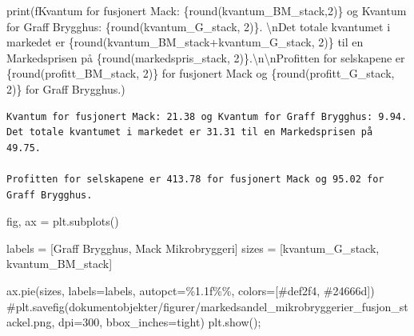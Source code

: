 \documentclass[
  12pt,
  a4paper,
  DIV=11,
  numbers=noendperiod]{scrartcl}
\newenvironment{Shaded}{\begin{snugshade}}{\end{snugshade}}
\newcommand{\BuiltInTok}[1]{\textcolor[rgb]{0.00,0.23,0.31}{#1}}
\newcommand{\CharTok}[1]{\textcolor[rgb]{0.13,0.47,0.30}{#1}}
\newcommand{\CommentTok}[1]{\textcolor[rgb]{0.37,0.37,0.37}{#1}}
\newcommand{\DecValTok}[1]{\textcolor[rgb]{0.68,0.00,0.00}{#1}}
\newcommand{\NormalTok}[1]{\textcolor[rgb]{0.00,0.23,0.31}{#1}}
\newcommand{\OperatorTok}[1]{\textcolor[rgb]{0.37,0.37,0.37}{#1}}
\newcommand{\SpecialCharTok}[1]{\textcolor[rgb]{0.37,0.37,0.37}{#1}}
\newcommand{\SpecialStringTok}[1]{\textcolor[rgb]{0.13,0.47,0.30}{#1}}
\newcommand{\StringTok}[1]{\textcolor[rgb]{0.13,0.47,0.30}{#1}}
\begin{document}
\begin{Shaded}
\begin{Highlighting}[]
\BuiltInTok{print}\NormalTok{(}\SpecialStringTok{f\textquotesingle{}\textquotesingle{}\textquotesingle{}Kvantum for fusjonert Mack: }\SpecialCharTok{\{}\BuiltInTok{round}\NormalTok{(kvantum\_BM\_stack,}\DecValTok{2}\NormalTok{)}\SpecialCharTok{\}}\SpecialStringTok{ og Kvantum for Graff Brygghus: }\SpecialCharTok{\{}\BuiltInTok{round}\NormalTok{(kvantum\_G\_stack, }\DecValTok{2}\NormalTok{)}\SpecialCharTok{\}}\SpecialStringTok{. }\CharTok{\textbackslash{}n}\SpecialStringTok{Det totale kvantumet i markedet er }\SpecialCharTok{\{}\BuiltInTok{round}\NormalTok{(kvantum\_BM\_stack}\OperatorTok{+}\NormalTok{kvantum\_G\_stack, }\DecValTok{2}\NormalTok{)}\SpecialCharTok{\}}\SpecialStringTok{ til en Markedsprisen på }\SpecialCharTok{\{}\BuiltInTok{round}\NormalTok{(markedspris\_stack, }\DecValTok{2}\NormalTok{)}\SpecialCharTok{\}}\SpecialStringTok{.}\CharTok{\textbackslash{}n\textbackslash{}n}\SpecialStringTok{Profitten for selskapene er }\SpecialCharTok{\{}\BuiltInTok{round}\NormalTok{(profitt\_BM\_stack, }\DecValTok{2}\NormalTok{)}\SpecialCharTok{\}}\SpecialStringTok{ for fusjonert Mack og }\SpecialCharTok{\{}\BuiltInTok{round}\NormalTok{(profitt\_G\_stack, }\DecValTok{2}\NormalTok{)}\SpecialCharTok{\}}\SpecialStringTok{ for Graff Brygghus.\textquotesingle{}\textquotesingle{}\textquotesingle{}}\NormalTok{)}
\end{Highlighting}
\end{Shaded}

\begin{verbatim}
Kvantum for fusjonert Mack: 21.38 og Kvantum for Graff Brygghus: 9.94. 
Det totale kvantumet i markedet er 31.31 til en Markedsprisen på 49.75.

Profitten for selskapene er 413.78 for fusjonert Mack og 95.02 for Graff Brygghus.
\end{verbatim}

\begin{Shaded}
\begin{Highlighting}[]
\NormalTok{fig, ax }\OperatorTok{=}\NormalTok{ plt.subplots()}

\NormalTok{labels }\OperatorTok{=}\NormalTok{ [}\StringTok{\textquotesingle{}Graff Brygghus\textquotesingle{}}\NormalTok{, }\StringTok{\textquotesingle{}Mack Mikrobryggeri\textquotesingle{}}\NormalTok{]}
\NormalTok{sizes }\OperatorTok{=}\NormalTok{ [kvantum\_G\_stack, kvantum\_BM\_stack]}

\NormalTok{ax.pie(sizes, labels}\OperatorTok{=}\NormalTok{labels, autopct}\OperatorTok{=}\StringTok{\textquotesingle{}}\SpecialCharTok{\%1.1f\%\%}\StringTok{\textquotesingle{}}\NormalTok{, colors}\OperatorTok{=}\NormalTok{[}\StringTok{\textquotesingle{}\#def2f4\textquotesingle{}}\NormalTok{, }\StringTok{\textquotesingle{}\#24666d\textquotesingle{}}\NormalTok{])}
\CommentTok{\#plt.savefig(\textquotesingle{}dokumentobjekter/figurer/markedsandel\_mikrobryggerier\_fusjon\_stackel.png\textquotesingle{}, dpi=300, bbox\_inches=\textquotesingle{}tight\textquotesingle{})}
\NormalTok{plt.show()}\OperatorTok{;}
\end{Highlighting}
\end{Shaded}
\end{document}
